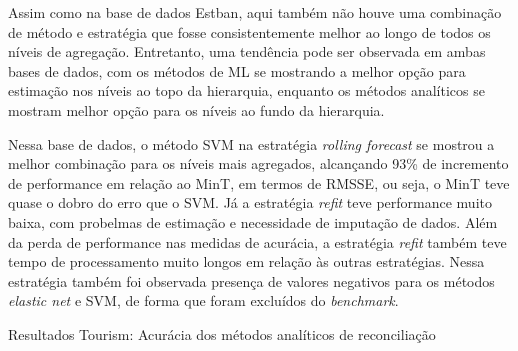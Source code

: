 \begin{apendicesenv}
Assim como na base de dados Estban, aqui também não houve uma combinação
de método e estratégia que fosse consistentemente melhor ao longo de
todos os níveis de agregação. Entretanto, uma tendência pode ser
observada em ambas bases de dados, com os métodos de ML se mostrando a
melhor opção para estimação nos níveis ao topo da hierarquia, enquanto
os métodos analíticos se mostram melhor opção para os níveis ao fundo da
hierarquia.

Nessa base de dados, o método SVM na estratégia \emph{rolling forecast}
se mostrou a melhor combinação para os níveis mais agregados, alcançando
93\% de incremento de performance em relação ao MinT, em termos de
RMSSE, ou seja, o MinT teve quase o dobro do erro que o SVM. Já a estratégia \emph{refit} teve performance muito baixa, com probelmas de estimação e necessidade de imputação de dados. Além da perda de performance nas medidas de acurácia, a estratégia \emph{refit} também teve tempo de processamento muito longos em relação às outras estratégias. Nessa estratégia também foi observada presença de valores negativos para os métodos \emph{elastic net} e SVM, de forma que foram excluídos do \emph{benchmark}.

\hypertarget{tbl-tourism-results-analiticos}{}
\begin{table}
\caption{\label{tbl-tourism-results-analiticos}Resultados Tourism: Acurácia dos métodos analíticos de reconciliação }\tabularnewline


\end{table}
\end{apendicesenv}
